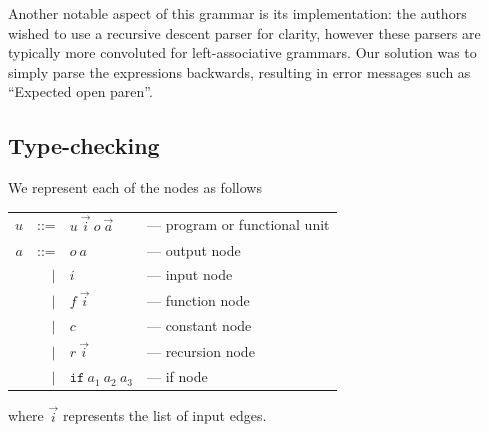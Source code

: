 \documentclass[12pt,UTF8,a4]{article}
\newcommand{\code}[1]{\texttt{#1}}
\begin{document}
Another notable aspect of this grammar is its implementation: the
authors wished to use a recursive descent parser for clarity, however
these parsers are typically more convoluted for left-associative
grammars. Our solution was to simply parse the expressions backwards,
resulting in error messages such as ``Expected open paren''.

\subsection{Type-checking}
We represent each of the nodes as follows
\begin{center}
  \begin{tabular}{rrll}
    $u$ & ::= & $u\ \vec{i}\ o\ \vec{a}$ & --- program or functional unit
    \\
    $a$ & ::= & $o\ a$ & --- output node
    \\
    & $|$ & $i$ &  --- input node
    \\
    & $|$ & $f\ \vec{i}$ &  --- function node
    \\
    & $|$ & $c$ &  --- constant node
    \\
    & $|$ & $r\ \vec{i}$ &  --- recursion node
    \\
    & $|$ & $\code{if}\ a_1\ a_2\ a_3$ &  --- if node
    \\
  \end{tabular}
\end{center}
where $\vec{i}$ represents the list of input edges.
\end{document}
